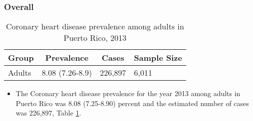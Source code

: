 
\subsubsection{Overall}




\begin{table}[H]
\caption{Coronary heart disease prevalence among adults in Puerto Rico, 2013\label{tab:Overall.tabl.Coronary_Heart_Disease.2013}} 
\begin{center}
\begin{tabular}{llll}
\hline\hline
\multicolumn{1}{l}{Group}&\multicolumn{1}{c}{Prevalence}&\multicolumn{1}{c}{Cases}&\multicolumn{1}{c}{Sample Size}\tabularnewline
\hline
Adults&8.08 (7.26-8.9)&226,897&6,011\tabularnewline
\hline
\end{tabular}\end{center}

\end{table}




\begin{itemize}


\item The Coronary heart disease prevalence for the year 2013 among adults in Puerto Rico was 8.08 (7.25-8.90) percent and the estimated number of cases was 226,897,
Table \ref{tab:Overall.tabl.Coronary_Heart_Disease.2013}.

\end{itemize}


